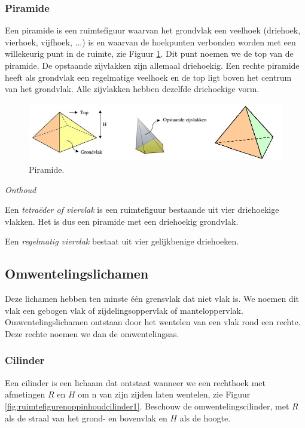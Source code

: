 \subsubsection{Piramide}
Een piramide is een ruimtefiguur waarvan het grondvlak een veelhoek (driehoek, vierhoek, vijfhoek, $\ldots$) is en waarvan de hoekpunten verbonden worden met een willekeurig punt in de ruimte, zie Figuur \ref{fig:piramide}. Dit punt noemen we de top van de piramide. De opstaande zijvlakken zijn allemaal driehoekig. Een rechte piramide heeft als grondvlak een regelmatige veelhoek en de top ligt boven het centrum van het grondvlak. Alle zijvlakken hebben dezelfde driehoekige vorm.

\begin{figure}
	\centering
	\includegraphics[width=0.7\linewidth]{4_opp_inhoud_an_meetk/inputs/piramide}
	\caption{Piramide.}
	\label{fig:piramide}
\end{figure}


\emph{Onthoud}


Een \emph{tetra\"eder of viervlak} is een ruimtefiguur bestaande uit vier driehoekige vlakken. Het is dus een piramide met een driehoekig grondvlak.

Een \emph{regelmatig viervlak} bestaat uit vier gelijkbenige driehoeken.


\subsection{Omwentelingslichamen}

Deze lichamen hebben ten minste \'e\'en grensvlak dat niet vlak is. We noemen dit vlak een gebogen vlak of zijdelingsoppervlak of manteloppervlak. Omwentelingslichamen ontstaan door het wentelen van een vlak rond een rechte. Deze rechte noemen we dan de omwentelingsas.

\subsubsection{Cilinder}
Een cilinder is een lichaam dat ontstaat wanneer we een rechthoek met afmetingen  $R$ en $H$ om n van zijn zijden laten wentelen, zie Figuur \ref{fig:ruimtefigurenoppinhoudcilinder1}. Beschouw de omwentelingscilinder, met $R$ als de straal van het grond- en bovenvlak en $H$ als de hoogte.

